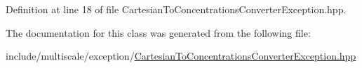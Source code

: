 Definition at line 18 of file Cartesian\-To\-Concentrations\-Converter\-Exception.\-hpp.



The documentation for this class was generated from the following file\-:\begin{DoxyCompactItemize}
\item 
include/multiscale/exception/\hyperlink{CartesianToConcentrationsConverterException_8hpp}{Cartesian\-To\-Concentrations\-Converter\-Exception.\-hpp}\end{DoxyCompactItemize}
